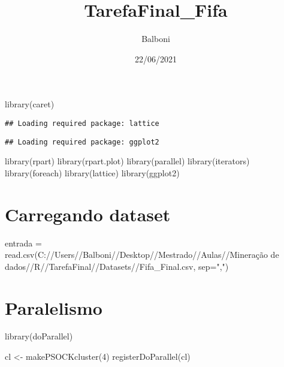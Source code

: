 \documentclass[
]{article}
\title{TarefaFinal\_Fifa}
\author{Balboni}
\date{22/06/2021}
\newenvironment{Shaded}{\begin{snugshade}}{\end{snugshade}}
\newcommand{\AttributeTok}[1]{\textcolor[rgb]{0.77,0.63,0.00}{#1}}
\newcommand{\DecValTok}[1]{\textcolor[rgb]{0.00,0.00,0.81}{#1}}
\newcommand{\FunctionTok}[1]{\textcolor[rgb]{0.00,0.00,0.00}{#1}}
\newcommand{\NormalTok}[1]{#1}
\newcommand{\OtherTok}[1]{\textcolor[rgb]{0.56,0.35,0.01}{#1}}
\newcommand{\StringTok}[1]{\textcolor[rgb]{0.31,0.60,0.02}{#1}}
\begin{document}
\maketitle

\begin{Shaded}
\begin{Highlighting}[]
\FunctionTok{library}\NormalTok{(caret)}
\end{Highlighting}
\end{Shaded}

\begin{verbatim}
## Loading required package: lattice
\end{verbatim}

\begin{verbatim}
## Loading required package: ggplot2
\end{verbatim}

\begin{Shaded}
\begin{Highlighting}[]
\FunctionTok{library}\NormalTok{(rpart)}
\FunctionTok{library}\NormalTok{(rpart.plot)}
\FunctionTok{library}\NormalTok{(parallel)}
\FunctionTok{library}\NormalTok{(iterators)}
\FunctionTok{library}\NormalTok{(foreach)}
\FunctionTok{library}\NormalTok{(lattice)}
\FunctionTok{library}\NormalTok{(ggplot2)}
\end{Highlighting}
\end{Shaded}

\hypertarget{carregando-dataset}{%
\section{Carregando dataset}\label{carregando-dataset}}

\begin{Shaded}
\begin{Highlighting}[]
\NormalTok{entrada }\OtherTok{=} \FunctionTok{read.csv}\NormalTok{(}\StringTok{\textquotesingle{}C://Users//Balboni//Desktop//Mestrado//Aulas//Mineração de dados//R//TarefaFinal//Datasets//Fifa\_Final.csv\textquotesingle{}}\NormalTok{, }\AttributeTok{sep=}\StringTok{","}\NormalTok{)}
\end{Highlighting}
\end{Shaded}

\hypertarget{paralelismo}{%
\section{Paralelismo}\label{paralelismo}}

\begin{Shaded}
\begin{Highlighting}[]
\FunctionTok{library}\NormalTok{(doParallel)}

\NormalTok{cl }\OtherTok{\textless{}{-}} \FunctionTok{makePSOCKcluster}\NormalTok{(}\DecValTok{4}\NormalTok{)}
\FunctionTok{registerDoParallel}\NormalTok{(cl)}
\end{Highlighting}
\end{Shaded}
\end{document}

